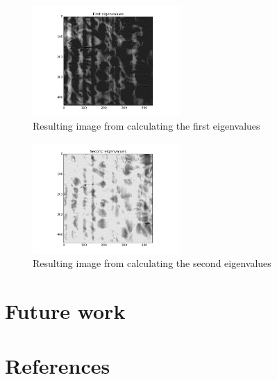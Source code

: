 \documentclass{article}
\begin{document}
\begin{figure}[H]
    \centering
    \includegraphics[width=0.5\textwidth]{esqinf/first}
    \caption{Resulting image from calculating the first eigenvalues}
    \label{average}
\end{figure}

\begin{figure}[H]
    \centering
    \includegraphics[width=0.5\textwidth]{esqinf/second}
    \caption{Resulting image from calculating the second eigenvalues}
    \label{average}
\end{figure}

\section{Future work}



\section{References}
\end{document}
